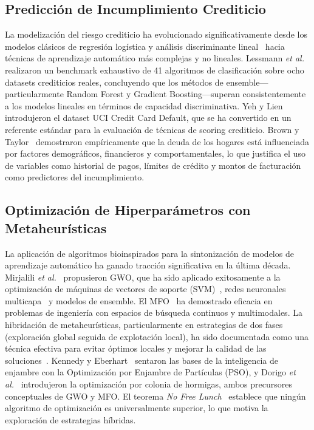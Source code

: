 \documentclass[journal]{IEEEtran}
\begin{document}
\subsection{Predicción de Incumplimiento Crediticio}
La modelización del riesgo crediticio ha evolucionado significativamente desde los modelos clásicos de regresión logística y análisis discriminante lineal~\cite{hand1997, thomas2000} hacia técnicas de aprendizaje automático más complejas y no lineales. Lessmann \textit{et al.}~\cite{lessmann2015} realizaron un benchmark exhaustivo de 41 algoritmos de clasificación sobre ocho datasets crediticios reales, concluyendo que los métodos de ensemble---particularmente Random Forest y Gradient Boosting---superan consistentemente a los modelos lineales en términos de capacidad discriminativa. Yeh y Lien~\cite{yeh2009} introdujeron el dataset UCI Credit Card Default, que se ha convertido en un referente estándar para la evaluación de técnicas de scoring crediticio. Brown y Taylor~\cite{brown2008} demostraron empíricamente que la deuda de los hogares está influenciada por factores demográficos, financieros y comportamentales, lo que justifica el uso de variables como historial de pagos, límites de crédito y montos de facturación como predictores del incumplimiento.

\subsection{Optimización de Hiperparámetros con Metaheurísticas}
La aplicación de algoritmos bioinspirados para la sintonización de modelos de aprendizaje automático ha ganado tracción significativa en la última década. Mirjalili \textit{et al.}~\cite{mirjalili2014} propusieron GWO, que ha sido aplicado exitosamente a la optimización de máquinas de vectores de soporte (SVM)~\cite{faris2018}, redes neuronales multicapa~\cite{mirjalili2017} y modelos de ensemble. El MFO~\cite{mirjalili2015} ha demostrado eficacia en problemas de ingeniería con espacios de búsqueda continuos y multimodales. La hibridación de metaheurísticas, particularmente en estrategias de dos fases (exploración global seguida de explotación local), ha sido documentada como una técnica efectiva para evitar óptimos locales y mejorar la calidad de las soluciones~\cite{yang2010, blum2003}. Kennedy y Eberhart~\cite{kennedy1995} sentaron las bases de la inteligencia de enjambre con la Optimización por Enjambre de Partículas (PSO), y Dorigo \textit{et al.}~\cite{dorigo1996} introdujeron la optimización por colonia de hormigas, ambos precursores conceptuales de GWO y MFO. El teorema \textit{No Free Lunch}~\cite{wolpert1997} establece que ningún algoritmo de optimización es universalmente superior, lo que motiva la exploración de estrategias híbridas.
\end{document}

